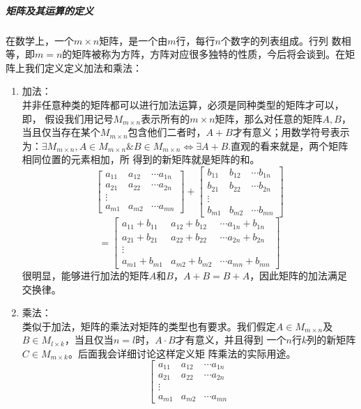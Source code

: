 \documentclass[a4paper,12pt]{ctexart}
\begin{document}
		\subparagraph{矩阵及其运算的定义}		
		在数学上，一个$m \times n$矩阵，是一个由$m$行，每行$n$个数字的列表组成。行列
		数相等，即$m=n$的矩阵被称为方阵，方阵对应很多独特的性质，今后将会谈到。在矩
		阵上我们定义定义加法和乘法：
		\begin{enumerate}
		\item{加法：}\\
		\indent 并非任意种类的矩阵都可以进行加法运算，必须是同种类型的矩阵才可以，即，
		假设我们用记号$M_{m \times n}$表示所有的$m \times n$矩阵，那么对任意的矩阵$A,B
		$，当且仅当存在某个$M_{m \times n}$包含他们二者时，$A+B$才有意义；用数学符号表示
		为：$\exists M_{m \times n},A \in M_{m \times n} \& B \in M_{m \times 
		n} \Leftrightarrow \exists A+B$.直观的看来就是，两个矩阵相同位置的元素相加，所
		得到的新矩阵就是矩阵的和。
		\[		
		\left[
		\begin{array}{cccc}
		a_{11} & a_{12} & \cdots a_{1n}\\
		a_{21} & a_{22} & \cdots a_{2n}\\
		\vdots \\
		a_{m1} & a_{m2} & \cdots a_{mn}
				
		\end{array}		
		\right]		
		+
		\left[
		\begin{array}{cccc}
		b_{11} & b_{12} & \cdots b_{1n}\\
		b_{21} & b_{22} & \cdots b_{2n}\\
		\vdots \\
		b_{m1} & b_{m2} & \cdots b_{mn}
				
		\end{array}		
		\right]
		\]
		\[
		=
		\left[
		\begin{array}{cccc}
		a_{11}+b_{11} & a_{12}+b_{12} & \cdots a_{1n}+b_{1n}\\
		a_{21}+b_{21} & a_{22}+b_{22} & \cdots a_{2n}+b_{2n}\\
		\vdots \\
		a_{m1}+b_{m1} & a_{m2}+b_{m2} & \cdots a_{mn}+b_{mn}
				
		\end{array}		
		\right]						
		\]
		\indent
		很明显，能够进行加法的矩阵$A$和$B$，$A+B=B+A$，因此矩阵的加法满足交换律。
		\item{乘法：}\\
		类似于加法，矩阵的乘法对矩阵的类型也有要求。我们假定$A\in M_{m \times n}$及
		$B \in M_{l \times k}$，当且仅当$n=l$时，$A \cdot B$才有意义，并且得到
		一个$n$行$k$列的新矩阵$C \in M_{m \times k}$。后面我会详细讨论这样定义矩
		阵乘法的实际用途。
		\[		
		\left[
		\begin{array}{cccc}
		a_{11} & a_{12} & \cdots a_{1n}\\
		a_{21} & a_{22} & \cdots a_{2n}\\
		\vdots \\
		a_{m1} & a_{m2} & \cdots a_{mn}
				

\end{array}\]
\end{enumerate}
\end{document}
